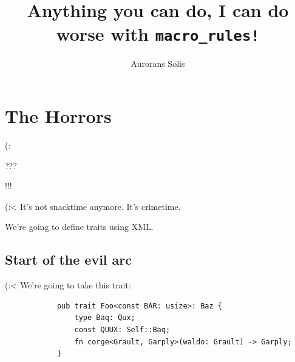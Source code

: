 \documentclass{beamer}
\title{Anything you can do, I can do worse with {\color{macrorulescolor}\texttt{macro\_rules!}}}
\author{Aurorans Solis}
\date{}
\begin{document}
	\begin{frame}
		\maketitle
	\end{frame}

	\section*{The Horrors}
	\begin{frame}{(:}
		\centering
		
	\end{frame}

	\begin{frame}{???}
		\centering
		
	\end{frame}

	\begin{frame}{!!!}
		\centering
		
	\end{frame}

	\begin{frame}{(:<}
		It's not snacktime anymore. It's crimetime.

		\pause

		We're going to define traits using XML.
	\end{frame}

	\subsection{Start of the evil arc}
	\begin{frame}[fragile]{(:<}
		We're going to take this trait:

		\begin{verbatim}
			pub trait Foo<const BAR: usize>: Baz {
				type Baq: Qux;
				const QUUX: Self::Baq;
				fn corge<Grault, Garply>(waldo: Grault) -> Garply;
			}
		\end{verbatim}
	\end{frame}
\end{document}
